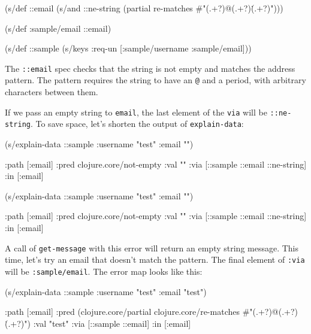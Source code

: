 \else

\begin{english}
  \begin{clojure}
(s/def ::email
  (s/and
   ::ne-string
   (partial re-matches #"(.+?)@(.+?)\.(.+?)")))

(s/def :sample/email ::email)

(s/def ::sample
  (s/keys :req-un [:sample/username
                   :sample/email]))
  \end{clojure}
\end{english}

\fi

The \verb|::email| spec checks that the string is not empty and matches the address pattern. The pattern requires the string to have an \verb|@| and a period, with arbitrary characters between them.

\mnoindent
If we pass an empty string to \verb|email|, the last element of the \verb|via| will be \verb|::ne-string|. To save space, let's shorten the output of \verb|explain-data|:

\ifx\DEVICETYPE\MOBILE

\begin{english}
  \begin{clojure}
(s/explain-data ::sample
  {:username "test" :email ""})

{:path [:email]
 :pred clojure.core/not-empty
 :val ""
 :via [::sample ::email ::ne-string]
 :in [:email]}
  \end{clojure}
\end{english}

\else

\begin{english}
  \begin{clojure}
(s/explain-data ::sample {:username "test" :email ""})

{:path [:email]
 :pred clojure.core/not-empty
 :val ""
 :via [::sample ::email ::ne-string]
 :in [:email]}
  \end{clojure}
\end{english}

\fi

A call of \verb|get-message| with this error will return an empty string message. This time, let's try an email that doesn't match the pattern. The final element of \verb|:via| will be \verb|:sample/email|. The error map looks like this:

\ifx\DEVICETYPE\MOBILE

\begin{english}
  \begin{clojure}
(s/explain-data ::sample
  {:username "test" :email "test"})

{:path [:email]
 :pred
 (clojure.core/partial
  clojure.core/re-matches
  #"(.+?)@(.+?)\.(.+?)")
 :val "test"
 :via [::sample ::email]
 :in [:email]}
  \end{clojure}
\end{english}

